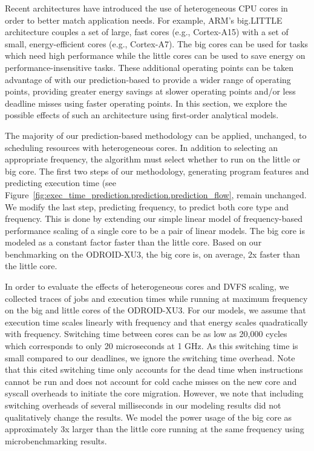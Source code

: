 Recent architectures have introduced the use of heterogeneous CPU cores in
order to better match application needs. For example, ARM's big.LITTLE
architecture couples a set of large, fast cores (e.g., Cortex-A15) with a set
of small, energy-efficient cores (e.g., Cortex-A7). The big cores can be used
for tasks which need high performance while the little cores can be used to
save energy on performance-insensitive tasks. These additional operating points
can be taken advantage of with our prediction-based to provide a wider range of
operating points, providing greater energy savings at slower operating points
and/or less deadline misses using faster operating points. In this section, we
explore the possible effects of such an architecture using first-order
analytical models.

The majority of our prediction-based methodology can be applied, unchanged, to
scheduling resources with heterogeneous cores. In addition to selecting an
appropriate frequency, the algorithm must select whether to run on the little
or big core. The first two steps of our methodology, generating program
features and predicting execution time (see
Figure~\ref{fig:exec_time_prediction.prediction.prediction_flow}, remain
unchanged. We modify the last step, predicting frequency, to predict both core
type and frequency. This is done by extending our simple linear model of
frequency-based performance scaling of a single core to be a pair of linear
models. The big core is modeled as a constant factor faster than the little
core. Based on our benchmarking on the ODROID-XU3, the big core is, on average,
2x faster than the little core.

In order to evaluate the effects of heterogeneous cores and DVFS scaling, we
collected traces of jobs and execution times while running at maximum frequency
on the big and little cores of the ODROID-XU3. For our models, we assume that
execution time scales linearly with frequency and that energy scales
quadratically with frequency. Switching time between cores can be as low as
20,000 cycles \cite{cho-12} which corresponds to only 20 microseconds at 1 GHz.
As this switching time is small compared to our deadlines, we ignore the
switching time overhead. Note that this cited switching time only accounts for
the dead time when instructions cannot be run and does not account for cold
cache misses on the new core and syscall overheads to initiate the core
migration. However, we note that including switching overheads of several
milliseconds in our modeling results did not qualitatively change the results.
We model the power usage of the big core as approximately 3x larger than the
little core running at the same frequency using microbenchmarking results.

